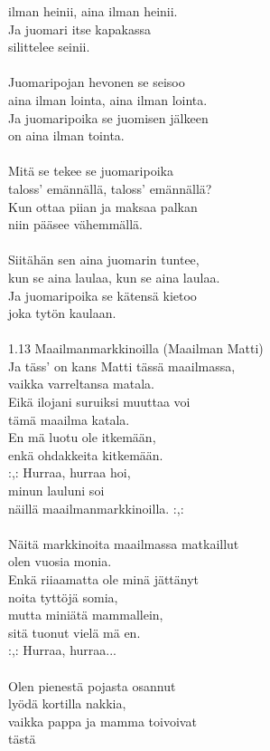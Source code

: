 ilman heinii, aina ilman heinii. \\ Ja juomari itse kapakassa \\ silittelee seinii. \\ \hspace{10mm} \\ Juomaripojan hevonen se seisoo \\ aina ilman lointa, aina ilman lointa. \\ Ja juomaripoika se juomisen jälkeen \\ on aina ilman tointa. \\ \hspace{10mm} \\ Mitä se tekee se juomaripoika \\ taloss' emännällä, taloss' emännällä? \\ Kun ottaa piian ja maksaa palkan \\ niin pääsee vähemmällä. \\ \hspace{10mm} \\ Siitähän sen aina juomarin tuntee, \\ kun se aina laulaa, kun se aina laulaa. \\ Ja juomaripoika se kätensä kietoo \\ joka tytön kaulaan. \\ \hspace{10mm} \\ 1.13 Maailmanmarkkinoilla (Maailman Matti) \\ Ja täss' on kans Matti tässä maailmassa, \\ vaikka varreltansa matala. \\ Eikä ilojani suruiksi muuttaa voi \\ tämä maailma katala. \\ En mä luotu ole itkemään, \\ enkä ohdakkeita kitkemään. \\ :,: Hurraa, hurraa hoi, \\ minun lauluni soi \\ näillä maailmanmarkkinoilla. :,: \\ \hspace{10mm} \\ Näitä markkinoita maailmassa matkaillut \\ olen vuosia monia. \\ Enkä riiaamatta ole minä jättänyt \\ noita tyttöjä somia, \\ mutta miniätä mammallein, \\ sitä tuonut vielä mä en. \\ :,: Hurraa, hurraa... \\ \hspace{10mm} \\ Olen pienestä pojasta osannut \\ lyödä kortilla nakkia, \\ vaikka pappa ja mamma toivoivat \\ tästä 